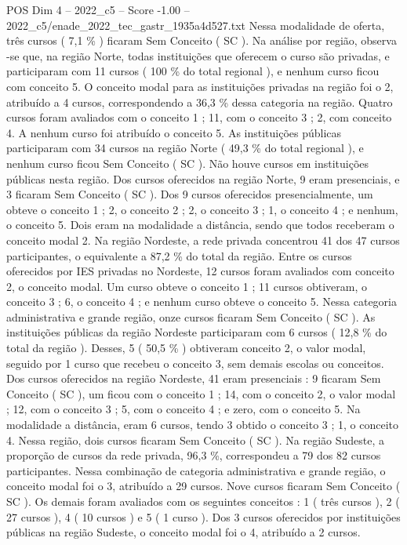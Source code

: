 \begin{textsample}{POS Dim 4 – 2022\_c5 – Score -1.00 – 2022\_c5/enade\_2022\_tec\_gastr\_1935a4d527.txt}
Nessa modalidade de oferta, três cursos ( 7,1 \% ) ficaram Sem Conceito ( SC ).
Na análise por região, observa -se que, na região Norte, todas instituições que oferecem o curso são privadas, e participaram com 11 cursos ( 100 \% do total regional ), e nenhum curso ficou com conceito 5.
O conceito modal para as instituições privadas na região foi o 2, atribuído a 4 cursos, correspondendo a 36,3 \% dessa categoria na região.
Quatro cursos foram avaliados com o conceito 1 ; 11, com o conceito 3 ; 2, com conceito 4.
A nenhum curso foi atribuído o conceito 5.
As instituições públicas participaram com 34 cursos na região Norte ( 49,3 \% do total regional ), e nenhum curso ficou Sem Conceito ( SC ).
Não houve cursos em instituições públicas nesta região.
Dos cursos oferecidos na região Norte, 9 eram presenciais, e 3 ficaram Sem Conceito ( SC ).
Dos 9 cursos oferecidos presencialmente, um obteve o conceito 1 ; 2, o conceito 2 ; 2, o conceito 3 ; 1, o conceito 4 ; e nenhum, o conceito 5.
Dois eram na modalidade a distância, sendo que todos receberam o conceito modal 2.
Na região Nordeste, a rede privada concentrou 41 dos 47 cursos participantes, o equivalente a 87,2 \% do total da região.
Entre os cursos oferecidos por IES privadas no Nordeste, 12 cursos foram avaliados com conceito 2, o conceito modal.
Um curso obteve o conceito 1 ; 11 cursos obtiveram, o conceito 3 ; 6, o conceito 4 ; e nenhum curso obteve o conceito 5.
Nessa categoria administrativa e grande região, onze cursos ficaram Sem Conceito ( SC ).
As instituições públicas da região Nordeste participaram com 6 cursos ( 12,8 \% do total da região ).
Desses, 5 ( 50,5 \% ) obtiveram conceito 2, o valor modal, seguido por 1 curso que recebeu o conceito 3, sem demais escolas ou conceitos.
Dos cursos oferecidos na região Nordeste, 41 eram presenciais : 9 ficaram Sem Conceito ( SC ), um ficou com o conceito 1 ; 14, com o conceito 2, o valor modal ; 12, com o conceito 3 ; 5, com o conceito 4 ; e zero, com o conceito 5.
Na modalidade a distância, eram 6 cursos, tendo 3 obtido o conceito 3 ; 1, o conceito 4.
Nessa região, dois cursos ficaram Sem Conceito ( SC ).
Na região Sudeste, a proporção de cursos da rede privada, 96,3 \%, correspondeu a 79 dos 82 cursos participantes.
Nessa combinação de categoria administrativa e grande região, o conceito modal foi o 3, atribuído a 29 cursos.
Nove cursos ficaram Sem Conceito ( SC ).
Os demais foram avaliados com os seguintes conceitos : 1 ( três cursos ), 2 ( 27 cursos ), 4 ( 10 cursos ) e 5 ( 1 curso ).
Dos 3 cursos oferecidos por instituições públicas na região Sudeste, o conceito modal foi o 4, atribuído a 2 cursos.

\end{textsample}
